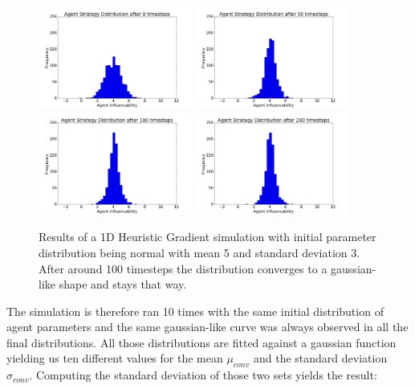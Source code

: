 \documentclass[11pt]{article}
\begin{document}
\begin{figure}
  \centering
  \quad
  \includegraphics[width=0.45\textwidth]{figures/convergence_example_1.png}
  \includegraphics[width=0.45\textwidth]{figures/convergence_example_2.png}
  \includegraphics[width=0.45\textwidth]{figures/convergence_example_3.png}
  \includegraphics[width=0.45\textwidth]{figures/convergence_example_4.png}
  \caption[Convergence Example]{Results of a 1D Heuristic Gradient simulation with initial parameter distribution being normal with mean 5 and standard deviation 3. After around 100 timesteps the distribution converges to a gaussian-like shape and stays that way.}
  \label{fig:convergenceexample}
\end{figure}
The simulation is therefore ran 10 times with the same initial distribution of agent parameters and the same gaussian-like curve was always observed in all the final distributions. All those distributions are fitted against a gaussian function yielding us ten different values for the mean $\mu_{conv}$ and the standard deviation $\sigma_{conv}$. Computing the standard deviation of those two sets yields the result:
\end{document}
